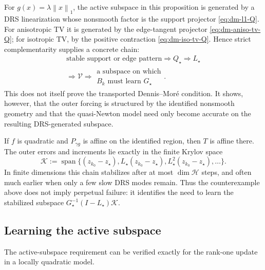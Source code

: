 \documentclass[10pt,leqno]{amsart}
\numberwithin{equation}{section}
\numberwithin{algorithm}{section}
\theoremstyle{remark}
\newcommand{\Hcal}{\mathcal{H}}
\newcommand{\norm}[1]{\left\lVert #1 \right\rVert}
\begin{document}
For \(g(x)=\lambda\norm{x}_1\), the active subspace in this proposition is generated by a DRS linearization whose nonsmooth factor is the support projector \eqref{eq:dm-l1-Q}.  For anisotropic TV it is generated by the edge-tangent projector \eqref{eq:dm-aniso-tv-Q}; for isotropic TV, by the positive contraction \eqref{eq:dm-iso-tv-Q}.  Hence strict complementarity supplies a concrete chain:
\[
   \begin{gathered}
   \text{stable support or edge pattern}
   \Longrightarrow Q_\star
   \Longrightarrow L_\star\\
   \Longrightarrow \mathcal V
   \Longrightarrow
     \begin{gathered}
       \text{a subspace on which}\\
       B_k\text{ must learn }G_\star
     \end{gathered}.
   \end{gathered}
\]
This does not itself prove the transported Dennis--Mor\'e condition.  It shows, however, that the outer forcing is structured by the identified nonsmooth geometry and that the quasi-Newton model need only become accurate on the resulting DRS-generated subspace.

If \(f\) is quadratic and \(P_{\gamma g}\) is affine on the identified region, then \(T\) is affine there.  The outer errors and increments lie exactly in the finite Krylov space
\begin{equation}
\label{eq:dm-krylov-space}
    \mathcal K
    :=\operatorname{span}\{(z_{k_0}-z_\star),
        L_\star(z_{k_0}-z_\star),
        L_\star^2(z_{k_0}-z_\star),\ldots\}.
\end{equation}
In finite dimensions this chain stabilizes after at most \(\dim\Hcal\) steps, and often much earlier when only a few slow DRS modes remain.  Thus the counterexample above does not imply perpetual failure: it identifies the need to learn the stabilized subspace
\(
 G_\star^{-1}(I-L_\star)\mathcal K
\).


\subsection{Learning the active subspace}

The active-subspace requirement can be verified exactly for the rank-one update in a locally quadratic model.
\end{document}

